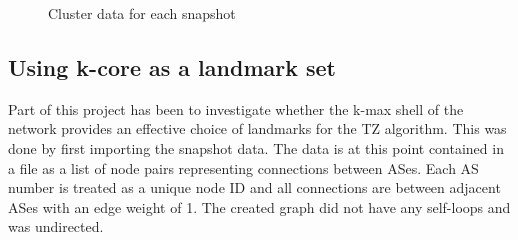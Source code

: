 \documentclass{mpaper}
\begin{document}
\begin{figure}
  \centering
  \hfill
  \hfill
  \caption{Cluster data for each snapshot}
\end{figure}

\subsection{Using k-core as a landmark set}
Part of this project has been to investigate whether the k-max shell of the network provides an effective choice of landmarks for the TZ algorithm. This was done by first importing the snapshot data. The data is at this point contained in a file as a list of node pairs representing connections between ASes. Each AS number is treated as a unique node ID and all connections are between adjacent ASes with an edge weight of 1. The created graph did not have any self-loops and was undirected.
\end{document}
